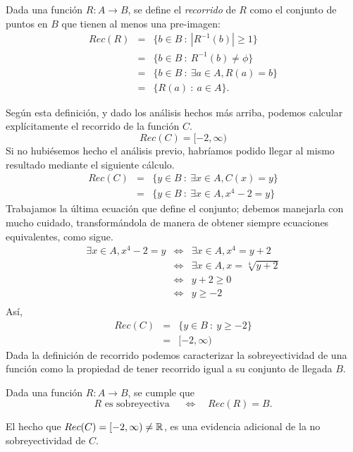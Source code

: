 \hspace{.5cm}

\begin{defn}
Dada una función  $R:A\rightarrow B$, se define el \emph{recorrido} de $R$  como el conjunto de puntos en $B$ que tienen al menos una pre-imagen:
\begin{eqnarray*}
Rec(R)&=&\{ b\in B\ :\ |R^{-1}(b)|\ge 1\}\\
&=&\{ b\in B\ :\ R^{-1}(b)\neq \phi\}\\
&=&\{ b\in B\ :\ \exists a\in A, R(a)=b\}\\
&=&\{ R(a)\ :\ a\in A\}.
\end{eqnarray*}
\end{defn}
Según esta definición, y dado los análisis hechos más arriba, podemos calcular explícitamente el recorrido de la función $C$.
$$Rec(C)=[-2,\infty)$$
Si no hubiésemos hecho el análisis previo, habríamos podido llegar al mismo resultado mediante el siguiente cálculo.
\begin{eqnarray*}
Rec(C)&=&\{ y\in B\ :\ \exists x\in A, C(x)=y\}\\
&=&\{ y\in B\ :\ \exists x\in A, x^4-2=y\}
\end{eqnarray*}
Trabajamos la última ecuación que define el conjunto; debemos manejarla con mucho cuidado, transformándola de manera de obtener siempre ecuaciones equivalentes, como sigue.
\begin{eqnarray*}
\exists x\in A, x^4-2=y&\Leftrightarrow& \exists x\in A, x^4=y+2\\
&\Leftrightarrow& \exists x\in A, x=\sqrt[4]{y+2}\\
&\Leftrightarrow& y+2\ge 0\\
&\Leftrightarrow& y\ge -2\\
\end{eqnarray*}
\vspace{-1cm}
Así,
\begin{eqnarray*}
Rec(C)&=&\{ y\in B\ :\ y\ge -2\}\\
&=&[-2,\infty)
\end{eqnarray*}
Dada la definición de recorrido podemos caracterizar la sobreyectividad de una función como la propiedad de tener recorrido igual a su conjunto de llegada $B$.

\hspace{.2cm}

\begin{thm}
Dada una función  $R:A\rightarrow B$, se cumple que
$$R \textrm{ es sobreyectiva }\quad \Longleftrightarrow\quad Rec(R)=B.$$
\end{thm}
El hecho que $Rec(C)=[-2,\infty)\not=\mathbb{R}$, es una evidencia adicional de la no sobreyectividad de $C$.

